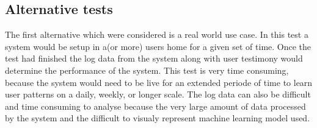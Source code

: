 \subsection{Alternative tests}
The first alternative which were considered is a real world use case. In this test a system would be setup in a(or more) users home for a given set of time. Once the test had finished the log data from the system along with user testimony would determine the performance of the system. This test is very time consuming, because the system would need to be live for an extended periode of time to learn user patterns on a daily, weekly, or longer scale. The log data can also be difficult and time consuming to analyse because the very large amount of data processed by the system and the difficult to visualy represent machine learning model used.
